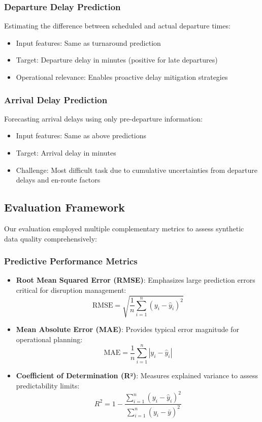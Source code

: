 \documentclass[conference]{IEEEtran}
\begin{document}
\subsubsection{Departure Delay Prediction}
Estimating the difference between scheduled and actual departure times:
\begin{itemize}
    \item Input features: Same as turnaround prediction
    \item Target: Departure delay in minutes (positive for late departures)
    \item Operational relevance: Enables proactive delay mitigation strategies
\end{itemize}

\subsubsection{Arrival Delay Prediction}
Forecasting arrival delays using only pre-departure information:
\begin{itemize}
    \item Input features: Same as above predictions
    \item Target: Arrival delay in minutes
    \item Challenge: Most difficult task due to cumulative uncertainties from departure delays and en-route factors
\end{itemize}

\subsection{Evaluation Framework}

Our evaluation employed multiple complementary metrics to assess synthetic data quality comprehensively:

\subsubsection{Predictive Performance Metrics}
\begin{itemize}
    \item \textbf{Root Mean Squared Error (RMSE)}: Emphasizes large prediction errors critical for disruption management:
    \begin{equation}
    \text{RMSE} = \sqrt{\frac{1}{n}\sum_{i=1}^{n}(y_i - \hat{y}_i)^2}
    \end{equation}
    
    \item \textbf{Mean Absolute Error (MAE)}: Provides typical error magnitude for operational planning:
    \begin{equation}
    \text{MAE} = \frac{1}{n}\sum_{i=1}^{n}|y_i - \hat{y}_i|
    \end{equation}
    
    \item \textbf{Coefficient of Determination (R²)}: Measures explained variance to assess predictability limits:
    \begin{equation}
    R^2 = 1 - \frac{\sum_{i=1}^{n}(y_i - \hat{y}_i)^2}{\sum_{i=1}^{n}(y_i - \bar{y})^2}
    \end{equation}
\end{itemize}
\end{document}
